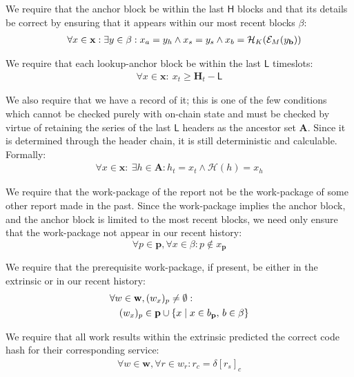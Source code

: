 We require that the anchor block be within the last $\mathsf{H}$ blocks and that its details be correct by ensuring that it appears within our most recent blocks $\beta$:
\begin{align}
  \forall x \in \mathbf{x} : \exists y \in \beta : x_a = y_h \wedge x_s = y_s \wedge x_b = \mathcal{H}_K(\mathcal{E}_M(y_\mathbf{b}))\!\!\!\!\!\!
\end{align}

We require that each lookup-anchor block be within the last $\mathsf{L}$ timeslots:
\begin{align}
  \forall x \in \mathbf{x} :\ x_t \ge \mathbf{H}_t - \mathsf{L}
\end{align}

We also require that we have a record of it; this is one of the few conditions which cannot be checked purely with on-chain state and must be checked by virtue of retaining the series of the last $\mathsf{L}$ headers as the ancestor set $\mathbf{A}$. Since it is determined through the header chain, it is still deterministic and calculable. Formally:
\begin{align}
  \forall x \in \mathbf{x} :\ \exists h \in \mathbf{A}: h_t = x_t \wedge \mathcal{H}(h) = x_h
\end{align}

We require that the work-package of the report not be the work-package of some other report made in the past. Since the work-package implies the anchor block, and the anchor block is limited to the most recent blocks, we need only ensure that the work-package not appear in our recent history:
\begin{equation}
  \forall p \in \mathbf{p}, \forall x \in \beta : p \not\in x_\mathbf{p}
\end{equation}

We require that the prerequisite work-package, if present, be either in the extrinsic or in our recent history:
\begin{equation}\begin{aligned}
  &\forall w \in \mathbf{w}, (w_x)_p \ne \emptyset :\\
  &\quad(w_x)_p \in \mathbf{p} \cup \{ x \mid x \in b_\mathbf{p} ,\, b \in \beta \}
\end{aligned}\end{equation}

We require that all work results within the extrinsic predicted the correct code hash for their corresponding service:
\begin{align}\label{eq:reportcodesarecorrect}
  \forall w \in \mathbf{w}, \forall r \in w_r : r_c = \delta[r_s]_c
\end{align}









